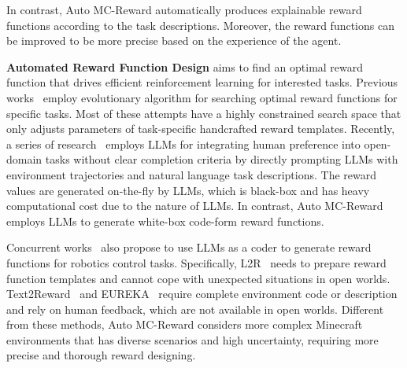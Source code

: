 In contrast, Auto MC-Reward automatically produces explainable reward functions according to the task descriptions. Moreover, the reward functions can be improved to be more precise based on the experience of the agent.


\vspace{0.5em}\noindent\textbf{Automated Reward Function Design} aims to find an optimal reward function that drives efficient reinforcement learning for interested tasks. Previous works~\cite{chiang2019learning,faust2019evolving} employ evolutionary algorithm for searching optimal reward functions for specific tasks. Most of these attempts have a highly constrained search space that only adjusts parameters of task-specific handcrafted reward templates. Recently, a series of research~\cite{du2023guiding,kwon2023reward,lin2022inferring,carta2022eager} employs LLMs for integrating human preference into open-domain tasks without clear completion criteria by directly prompting LLMs with environment trajectories and natural language task descriptions. The reward values are generated on-the-fly by LLMs, which is black-box and has heavy computational cost due to the nature of LLMs. In contrast, Auto MC-Reward employs LLMs to generate white-box code-form reward functions.

Concurrent works~\cite{yu2023language,xie2023text2reward,ma2023eureka} also propose to use LLMs as a coder to generate reward functions for robotics control tasks. Specifically, L2R~\cite{yu2023language} needs to prepare reward function templates and cannot cope with unexpected situations in open worlds. Text2Reward~\cite{xie2023text2reward} and EUREKA~\cite{ma2023eureka} require complete environment code or description and rely on human feedback, which are not available in open worlds. Different from these methods, Auto MC-Reward considers more complex Minecraft environments that has diverse scenarios and high uncertainty, requiring more precise and thorough reward designing.
